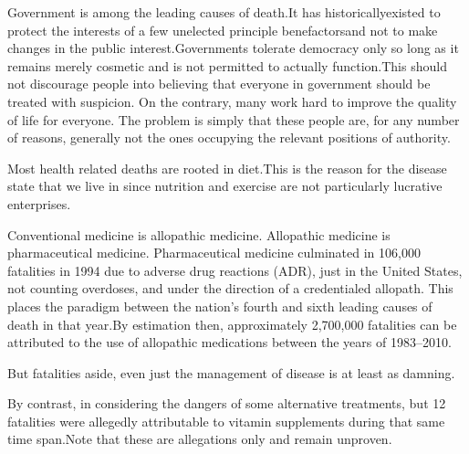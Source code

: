 
Government is among the leading causes of death. It has historically\footnotecite[wilson2007] existed to protect the interests of a few unelected principle benefactors\footnotecite[bowie2012] and not to make changes in the public interest. Governments tolerate democracy only so long as it remains merely cosmetic and is not permitted to actually function. This should not discourage people into believing that everyone in government should be treated with suspicion. On the contrary, many work hard to improve the quality of life for everyone. The problem is simply that these people are, for any number of reasons, generally not the ones occupying the relevant positions of authority.


Most health related deaths are rooted in diet. This is the reason for the disease state that we live in since nutrition and exercise are not particularly lucrative enterprises.


Conventional medicine is allopathic medicine. Allopathic medicine is pharmaceutical medicine. Pharmaceutical medicine culminated in 106,000 fatalities in 1994 due to adverse drug reactions (ADR), just in the United States, not counting overdoses, and under the direction of a credentialed allopath. This places the paradigm between the nation's fourth and sixth leading causes of death in that year. By estimation then, approximately 2,700,000 fatalities can be attributed to the use of allopathic medications between the years of 1983--2010. 

But fatalities aside, even just the management of disease is at least as damning.\footnotecite[leape2000]

By contrast, in considering the dangers of some alternative treatments, but 12 fatalities were allegedly attributable to vitamin supplements during that same time span. Note that these are allegations only and remain unproven.

